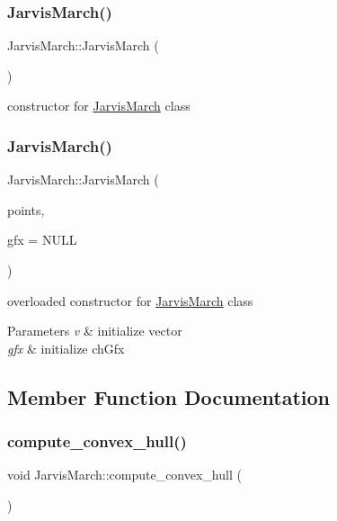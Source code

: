 \subsubsection{\texorpdfstring{JarvisMarch()}{JarvisMarch()}\hspace{0.1cm}{\footnotesize\ttfamily [1/2]}}
{\footnotesize\ttfamily Jarvis\+March\+::\+Jarvis\+March (\begin{DoxyParamCaption}{ }\end{DoxyParamCaption})}

constructor for \mbox{\hyperlink{class_jarvis_march}{Jarvis\+March}} class \mbox{\label{class_jarvis_march_a0f28b67cdc8868e9ccb84bbcc3ef340f}} 
\subsubsection{\texorpdfstring{JarvisMarch()}{JarvisMarch()}\hspace{0.1cm}{\footnotesize\ttfamily [2/2]}}
{\footnotesize\ttfamily Jarvis\+March\+::\+Jarvis\+March (\begin{DoxyParamCaption}\item[{std\+::vector$<$ \mbox{\hyperlink{class_point}{Point}} $>$ \&}]{points,  }\item[{\mbox{\hyperlink{class_convex_hull_graphix}{Convex\+Hull\+Graphix}} $\ast$}]{gfx = {\ttfamily NULL} }\end{DoxyParamCaption})}

overloaded constructor for \mbox{\hyperlink{class_jarvis_march}{Jarvis\+March}} class 
\begin{DoxyParams}{Parameters}
{\em v} & initialize vector \\
\hline
{\em gfx} & initialize ch\+Gfx \\
\hline
\end{DoxyParams}


\subsection{Member Function Documentation}
\mbox{\label{class_jarvis_march_a5617c3acf6ab1f5ad7988e0c856740c3}} 
\subsubsection{\texorpdfstring{compute\_convex\_hull()}{compute\_convex\_hull()}}
{\footnotesize\ttfamily void Jarvis\+March\+::compute\+\_\+convex\+\_\+hull (\begin{DoxyParamCaption}{ }\end{DoxyParamCaption})}


